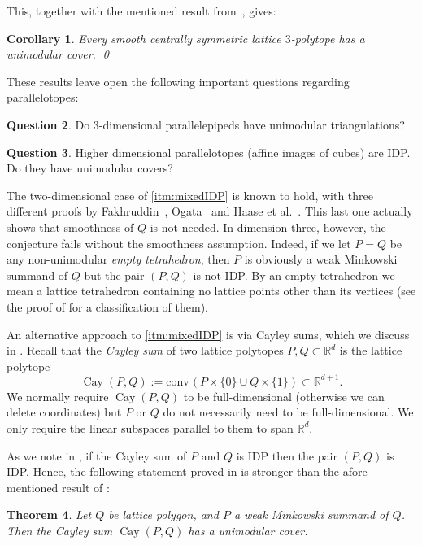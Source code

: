 \documentclass{amsart}
\theoremstyle{plain}
\newtheorem{theorem}{Theorem}[section]
\newtheorem{corollary}[theorem]{Corollary}
\theoremstyle{definition}
\newtheorem{question}[theorem]{Question}
\newcommand{\R}{ \ensuremath{\mathbb{R}}}
\newcommand{\conv}{\ensuremath{\mathrm{conv}}\hspace{1pt}}
\newcommand{\cayley}{\operatorname{Cay}}
\begin{document}
This, together with the mentioned result from~\cite{BHHHJKM2019}, gives:

\begin{corollary}
\label{coro:3cs}
Every smooth centrally symmetric lattice $3$-polytope has a unimodular cover. 
\qed
\end{corollary}

These results leave open the following important questions regarding parallelotopes:

\begin{question}
Do $3$-dimensional parallelepipeds have unimodular triangulations?
\end{question}

\begin{question}
Higher dimensional parallelotopes (affine images of cubes) are IDP. Do they have unimodular covers? 
\end{question}


The two-dimensional case of \eqref{itm:mixedIDP} is known to hold, with three different proofs by Fakhruddin~\cite{Fakhruddin}, Ogata~\cite{Ogata} and Haase et al.~\cite{HNPS2008}. This last one actually shows that smoothness of $Q$ is not needed. In dimension three, however, the conjecture fails without the smoothness assumption. Indeed, if we let $P=Q$ be any non-unimodular \emph{empty tetrahedron}, then $P$ is obviously a weak Minkowski summand of $Q$ but the pair $(P, Q)$ is not IDP. By an empty tetrahedron we mean a lattice tetrahedron containing no lattice points other than its vertices (see the proof of  for a classification of them).

An alternative approach to \eqref{itm:mixedIDP} is via Cayley sums, which we discuss in  . 
Recall that the \emph{Cayley sum} of two lattice polytopes $P,Q\subset \R^d$ is the lattice polytope
\[
\cayley(P,Q) := \conv(P\times\{0\} \cup Q \times \{1\}) \subset \R^{d+1}.
\]
We normally require $\cayley(P,Q)$ to be full-dimensional (otherwise we can delete coordinates) but $P$ or $Q$ do not necessarily need to be full-dimensional. We only require the linear subspaces parallel to them to span $\R^d$.

As we note in , if the Cayley sum of $P$ and $Q$ is IDP then the pair $(P,Q)$ is IDP.
Hence, the following statement proved in  is stronger than the afore-mentioned result of \cite{Fakhruddin,HNPS2008,Ogata}:

\begin{theorem}
\label{thm:cayley}
Let $Q$ be lattice polygon, and $P$ a weak Minkowski summand of $Q$. Then the Cayley sum $\cayley(P,Q)$ has a unimodular cover.
\end{theorem}
\end{document}
